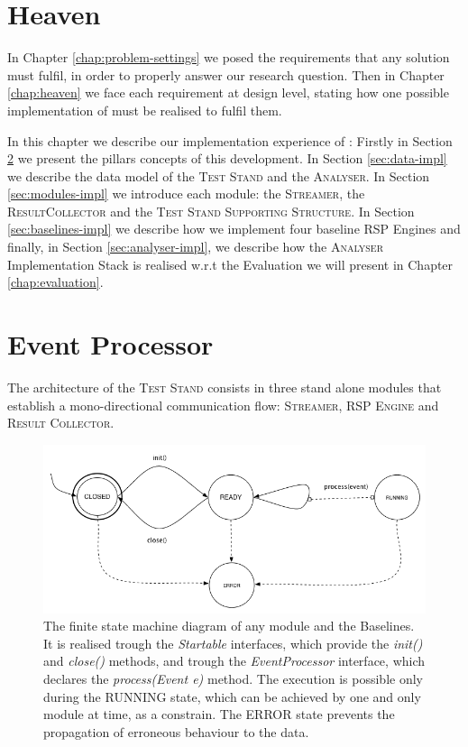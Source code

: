 \section{Heaven}\label{sec:impl-intro}

In Chapter \ref{chap:problem-settings} we posed the requirements that any solution must fulfil, in order to properly answer our research question. Then in Chapter \ref{chap:heaven} we face each requirement at design level, stating how one possible implementation of \name must be realised to fulfil them. 

In this chapter we describe our implementation experience of \namens: 
Firstly in Section \ref{sec:abstractions} we present the pillars concepts of this development. In Section \ref{sec:data-impl} we describe the data model of the \textsc{Test Stand} and the \textsc{Analyser}. In Section \ref{sec:modules-impl} we introduce each \name module: the \textsc{Streamer}, the \textsc{ResultCollector} and the \textsc{Test Stand Supporting Structure}. In Section \ref{sec:baselines-impl} we describe how we implement four baseline RSP Engines and finally, in Section \ref{sec:analyser-impl}, we describe how the \textsc{Analyser} Implementation Stack is realised w.r.t the Evaluation we will present in Chapter \ref{chap:evaluation}.

\section{Event Processor}\label{sec:abstractions}

The architecture of the \textsc{Test Stand} consists in three stand alone modules that establish a mono-directional communication flow: \textsc{Streamer}, \textsc{RSP Engine} and \textsc{Result Collector}. 

\begin{figure}[h!tb]
  \centering
	\includegraphics[width=\linewidth]{images/fsm-schema}
	\caption[\textit{EventProcessor} States Diagram]{The finite state machine diagram of any \name module and the Baselines. It is realised trough the \textit{Startable} interfaces, which provide the \textit{init()} and \textit{close() }methods, and trough the \textit{EventProcessor} interface, which declares the \textit{process(Event e)} method. The execution is possible only during the RUNNING state, which can be achieved by one and only module at time, as a constrain. The ERROR state prevents the propagation of erroneous behaviour to the data.}
  	\label{fig:module-fsm}
\end{figure}

